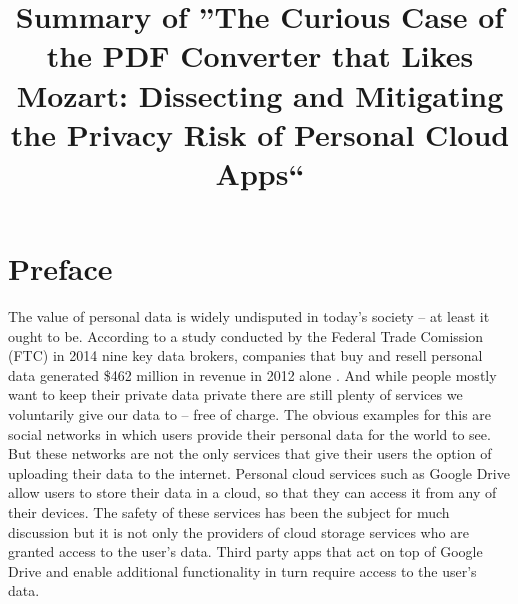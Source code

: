 \documentclass[11pt,twocolumn,a4paper,DIV=calc]{scrartcl}
\begin{document}
\title{Summary of ''The Curious Case of the PDF Converter that Likes Mozart: Dissecting and Mitigating the Privacy Risk of Personal Cloud Apps``}
\date{}
\maketitle

\section{Preface}
The value of personal data is widely undisputed in today’s society – at least it ought to be. According to a study conducted by the Federal Trade Comission (FTC) in 2014 nine key data brokers, companies that buy and resell personal data generated \$462 million in revenue in 2012 alone \cite{FTCStudy}. And while people mostly want to keep their private data private \cite{WorthOfData} there are still plenty of services we voluntarily give our data to – free of charge. The obvious examples for this are social networks in which users provide their personal data for the world to see. But these networks are not the only services that give their users the option of uploading their data to the internet. Personal cloud services such as Google Drive allow users to store their data in a cloud, so that they can access it from any of their devices. The safety of these services has been the subject for much discussion \cite{CloudSecurity} but it is not only the providers of cloud storage services who are granted access to the user's data. Third party apps that act on top of Google Drive and enable additional functionality in turn require access to the user's data.
\end{document}
